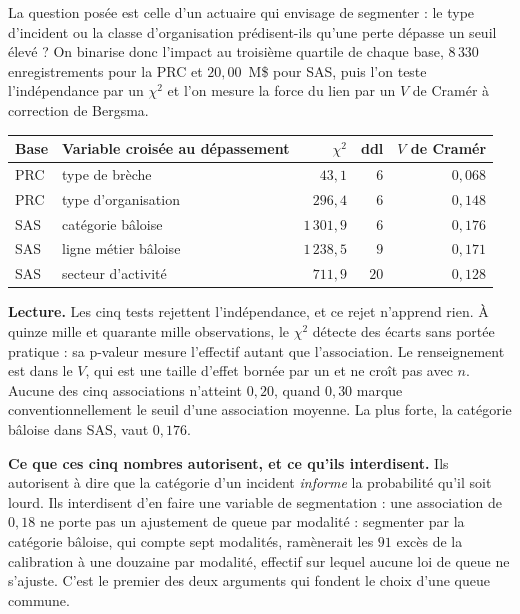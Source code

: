 La question posée est celle d'un actuaire qui envisage de segmenter : le type d'incident ou la
classe d'organisation prédisent-ils qu'une perte dépasse un seuil élevé ? On binarise donc
l'impact au troisième quartile de chaque base, $8\,330$ enregistrements pour la PRC et
$20{,}00$~M\$ pour SAS, puis l'on teste l'indépendance par un $\chi^2$ et l'on mesure la force du
lien par un $V$ de Cramér à correction de Bergsma.

\begin{center}\small
\renewcommand{\arraystretch}{1.15}
\begin{tabular}{@{}l l r r r@{}}
\toprule
\textbf{Base} & \textbf{Variable croisée au dépassement} & \textbf{$\chi^2$} & \textbf{ddl} &
\textbf{$V$ de Cramér} \\
\midrule
PRC & type de brèche              & $43{,}1$     & $6$  & $0{,}068$ \\
PRC & type d'organisation         & $296{,}4$    & $6$  & $0{,}148$ \\
\midrule
SAS & catégorie bâloise           & $1\,301{,}9$ & $6$  & $0{,}176$ \\
SAS & ligne métier bâloise        & $1\,238{,}5$ & $9$  & $0{,}171$ \\
SAS & secteur d'activité          & $711{,}9$    & $20$ & $0{,}128$ \\
\bottomrule
\end{tabular}
\end{center}

\vspace{2pt}
\noindent\textbf{Lecture.} Les cinq tests rejettent l'indépendance, et ce rejet n'apprend rien.
À quinze mille et quarante mille observations, le $\chi^2$ détecte des écarts sans portée
pratique : sa p-valeur mesure l'effectif autant que l'association. Le renseignement est dans le
$V$, qui est une taille d'effet bornée par un et ne croît pas avec $n$. Aucune des cinq
associations n'atteint $0{,}20$, quand $0{,}30$ marque conventionnellement le seuil d'une
association moyenne. La plus forte, la catégorie bâloise dans SAS, vaut $0{,}176$.


\begin{cle}
\textbf{Ce que ces cinq nombres autorisent, et ce qu'ils interdisent.} Ils autorisent à dire que
la catégorie d'un incident \emph{informe} la probabilité qu'il soit lourd. Ils interdisent d'en
faire une variable de segmentation : une association de $0{,}18$ ne porte pas un ajustement de queue par
modalité : segmenter par la catégorie bâloise, qui compte sept modalités, ramènerait les $91$
excès de la calibration à une douzaine par modalité, effectif sur lequel aucune loi de queue ne
s'ajuste. C'est le premier des deux arguments qui fondent le choix d'une queue commune.
\end{cle}

